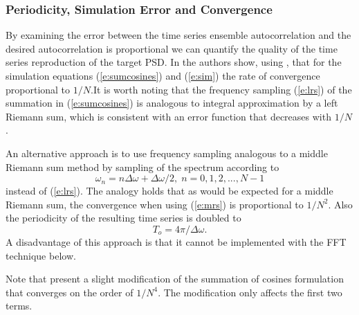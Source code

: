 \documentclass[11pt]{article}
\begin{document}
\subsubsection{Periodicity, Simulation Error and Convergence}

By examining the error between the time series ensemble autocorrelation and the
desired autocorrelation is proportional we can quantify the quality of the time series reproduction of the target PSD. In \cite{shinozuka91simulation} the authors show, using \cite{conte17elementary},  that for the simulation equations (\ref{e:sumcosines}) and (\ref{e:sim}) the rate of convergence proportional to $1/N$.It is worth noting that the frequency sampling (\ref{e:lrs}) of the summation in (\ref{e:sumcosines}) is analogous to integral approximation by a left Riemann sum, which is consistent with an error function that decreases with $1/N$.

An alternative approach is to use frequency sampling analogous to a middle Riemann sum method by sampling of the spectrum according to 
\begin{equation}
  \omega_n = n \Delta \omega + \Delta \omega /2 , \; n=0,1,2,...,N-1
  \label{e:mrs}
\end{equation}
instead of (\ref{e:lrs}).
The analogy holds that as would be expected for a middle Riemann sum, the convergence when using (\ref{e:mrs}) is proportional to $1/N^2$.  Also the periodicity of the resulting time series is doubled to
\begin{equation}
  T_o = 4\pi / \Delta \omega.
  \label{e:to}
\end{equation}
A disadvantage of this approach is that it cannot be implemented with the FFT technique below.

Note that \cite{hu97simulation} present a slight modification of the summation of cosines formulation that converges on the order of $1/N^4$.  The modification only affects the first two terms.
\end{document}
